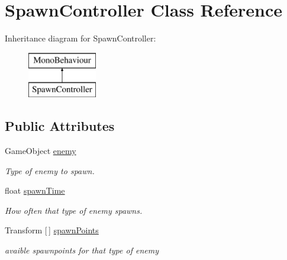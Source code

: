 \hypertarget{class_spawn_controller}{}\section{Spawn\+Controller Class Reference}
\label{class_spawn_controller}
Inheritance diagram for Spawn\+Controller\+:\begin{figure}[H]
\begin{center}
\leavevmode
\includegraphics[height=2.000000cm]{class_spawn_controller}
\end{center}
\end{figure}
\subsection*{Public Attributes}
\begin{DoxyCompactItemize}
\item 
\mbox{\label{class_spawn_controller_acd9a03f2504ffc0bee3cb51f49ffe70d}} 
Game\+Object \hyperlink{class_spawn_controller_acd9a03f2504ffc0bee3cb51f49ffe70d}{enemy}
\begin{DoxyCompactList}\small\item\em Type of enemy to spawn. \end{DoxyCompactList}\item 
\mbox{\label{class_spawn_controller_af5d0d5091092b0d6dcee6f670ba96b59}} 
float \hyperlink{class_spawn_controller_af5d0d5091092b0d6dcee6f670ba96b59}{spawn\+Time}
\begin{DoxyCompactList}\small\item\em How often that type of enemy spawns. \end{DoxyCompactList}\item 
\mbox{\label{class_spawn_controller_a094ea9629e5c9d39c4262f865ffae644}} 
Transform \mbox{[}$\,$\mbox{]} \hyperlink{class_spawn_controller_a094ea9629e5c9d39c4262f865ffae644}{spawn\+Points}
\begin{DoxyCompactList}\small\item\em avaible spawnpoints for that type of enemy \end{DoxyCompactList}\end{DoxyCompactItemize}

